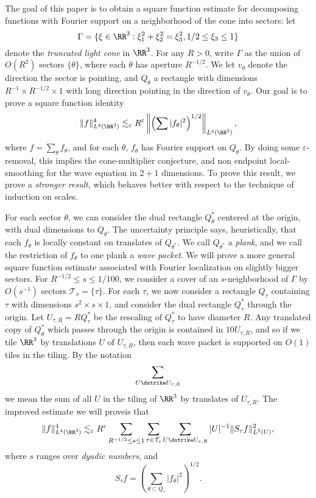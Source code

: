 The goal of this paper is to obtain a square function estimate for decomposing functions with Fourier support on a neighborhood of the cone into sectors: let
%
\[ \Gamma = \{ \xi \in \RR^3: \xi_1^2 + \xi_2^2 = \xi_3^2, 1/2 \leq \xi_3 \leq 1 \} \]
%
denote the \emph{truncated light cone} in $\RR^3$. For any $R > 0$, write $\Gamma$ as the union of $O(R^2)$ sectors $\{ \theta \}$, where each $\theta$ has aperture $R^{-1/2}$. We let $v_\theta$ denote the direction the sector is pointing, and $Q_\theta$ a rectangle with dimensions $R^{-1} \times R^{-1/2} \times 1$ with long direction pointing in the direction of $v_\theta$. Our goal is to prove a square function identity
%
\[ \| f \|_{L^4(\RR^3)}^4 \lesssim_\varepsilon R^\varepsilon \left\| \left( \sum |f_\theta|^2 \right)^{1/2} \right\|_{L^4(\RR^3)}, \]
%
where $f = \sum_\theta f_\theta$, and for each $\theta$, $f_\theta$ has Fourier support on $Q_\theta$. By doing some $\varepsilon$-removal, this implies the cone-multiplier conjecture, and non endpoint local-smoothing for the wave equation in $2+1$ dimensions. To prove this result, we prove a \emph{stronger result}, which behaves better with respect to the technique of induction on scales.

For each sector $\theta$, we can consider the dual rectangle $Q^*_\theta$ centered at the origin, with dual dimensions to $Q_\theta$. The uncertainty principle says, heuristically, that each $f_\theta$ is locally constant on translates of $Q_{\theta^*}$. We call $Q_{\theta^*}$ a \emph{plank}, and we call the restriction of $f_\theta$ to one plank a \emph{wave packet}. We will prove a more general square function estimate associated with Fourier localization on slightly bigger sectors. For $R^{-1/2} \leq s \leq 1/100$, we consider a cover of an $s$-neighborhood of $\Gamma$ by $O(s^{-1})$ sectors $\mathcal{T}_s = \{ \tau \}$. For each $\tau$, we now consider a rectangle $Q_\tau$ containing $\tau$ with dimensions $s^2 \times s \times 1$, and consider the dual rectangle $Q_\tau^*$ through the origin. Let $U_{\tau,R} = R Q_\tau^*$ be the rescaling of $Q_\tau^*$ to have diameter $R$. Any translated copy of $Q_\theta^*$ which passes through the origin is contained in $10 U_{\tau,R}$, and so if we tile $\RR^3$ by translations $U$ of $U_{\tau,R}$, then each wave packet is supported on $O(1)$ tiles in the tiling. By the notation
%
\[ \sum_{U \dstrike U_{\tau,R}} \]
%
we mean the sum of all $U$ in the tiling of $\RR^3$ by translates of $U_{\tau,R}$. The improved estimate we will proveis that
%
\[ \| f \|_{L^4(\RR^3)}^4 \lesssim_\varepsilon R^\varepsilon \sum_{R^{-1/2} \leq s \leq 1} \sum_{\tau \in \mathcal{T}_s} \sum_{U \dstrike U_{\tau,R}} |U|^{-1} \| S_\tau f \|_{L^2(U)}^2, \]
%
where $s$ ranges over \emph{dyadic numbers}, and
%
\[ S_\tau f = \left( \sum_{\theta \subset Q_\tau} |f_\theta|^2 \right)^{1/2}. \]











